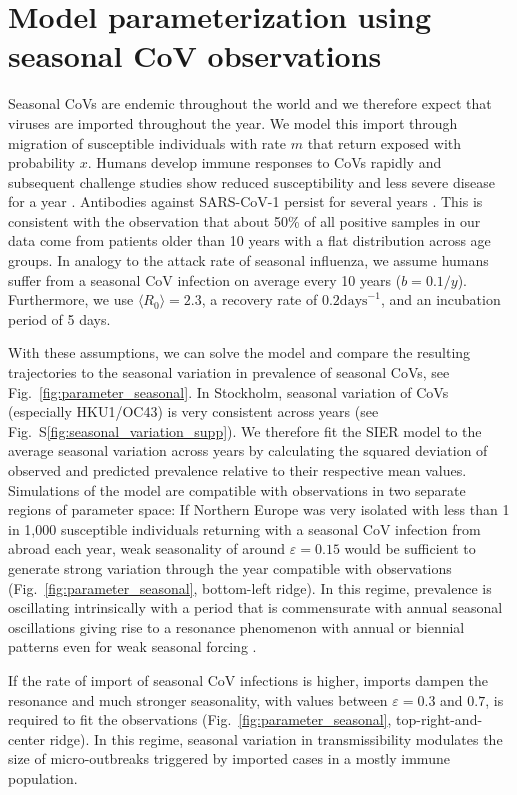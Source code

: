 \documentclass[rmp, reprint, superscriptaddress, floatfix,amsmath]{revtex4-1}
\newcommand{\forcing}{\varepsilon}
\begin{document}
\section{Model parameterization using seasonal CoV observations}
Seasonal CoVs are endemic throughout the world and we therefore expect that viruses are imported throughout the year. 
We model this import through migration of susceptible individuals with rate $m$ that return exposed with probability $x$. 
Humans develop immune responses to CoVs rapidly and subsequent challenge studies show reduced susceptibility and less severe disease for a year \citep{callow_time_1990}.
Antibodies against SARS-CoV-1 persist for several years \citep{guo_long-term_2020}. 
This is consistent with the observation that about 50\% of all positive samples in our data come from patients older than 10 years with a flat distribution across age groups.
In analogy to the attack rate of seasonal influenza, we assume humans suffer from a seasonal CoV infection on average every 10 years ($b=0.1/y$).
Furthermore, we use $\langle R_0\rangle=2.3$, a recovery rate of $0.2 \mathrm{days}^{-1}$, and an incubation period of 5 days.

With these assumptions, we can solve the model and compare the resulting trajectories to the seasonal variation in prevalence of seasonal CoVs, see Fig.~\ref{fig:parameter_seasonal}.
In Stockholm, seasonal variation of CoVs (especially HKU1/OC43) is very consistent across years (see Fig.~S\ref{fig:seasonal_variation_supp}). 
We therefore fit the SIER model to the average seasonal variation across years by calculating the squared deviation of observed and predicted prevalence relative to their respective mean values. 
Simulations of the model are compatible with observations in two separate regions of parameter space: If Northern Europe was very isolated with less than 1 in 1,000 susceptible individuals returning with a seasonal CoV infection from abroad each year, weak seasonality of around $\forcing=0.15$ would be sufficient to generate strong variation through the year compatible with observations (Fig.~\ref{fig:parameter_seasonal}, bottom-left ridge).
In this regime, prevalence is oscillating intrinsically with a period that is commensurate with annual seasonal oscillations giving rise to a resonance phenomenon with annual or biennial patterns even for weak seasonal forcing \citep{dushoff_dynamical_2004,chen_regular_2017}.

If the rate of import of seasonal CoV infections is higher, imports dampen the resonance and much stronger seasonality, with values between $\forcing=0.3$ and $0.7$, is required to fit the observations (Fig.~\ref{fig:parameter_seasonal}, top-right-and-center ridge).
In this regime, seasonal variation in transmissibility modulates the size of micro-outbreaks triggered by imported cases in a mostly immune population. 
\end{document}
